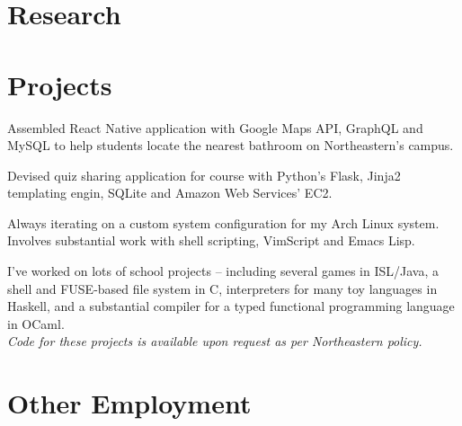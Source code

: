 \documentclass[letterpaper]{deedy-resume} %
\begin{document}
\begin{minipage}[t]{0.66\textwidth}
\sectionspace %

\section{Research}



\sectionspace %

\section{Projects}
Assembled React Native application with Google Maps API,
GraphQL and MySQL to help students locate the nearest bathroom
on Northeastern's campus.
\sectionspace

Devised quiz sharing application for course with Python's Flask,
Jinja2 templating engin, SQLite and Amazon Web Services' EC2.
\sectionspace

Always iterating on a custom system configuration for my Arch Linux system. \\
Involves substantial work with shell scripting, VimScript and Emacs Lisp.
\sectionspace

I've worked on lots of school projects -- including several games in ISL/Java,
a shell and FUSE-based file system in C,
interpreters for many toy languages in Haskell,
and a substantial compiler for a typed functional programming language in OCaml. \\
\textit{Code for these projects is available upon request as per Northeastern policy.}

\sectionspace
\section{Other Employment}


\end{minipage}
\end{document}

